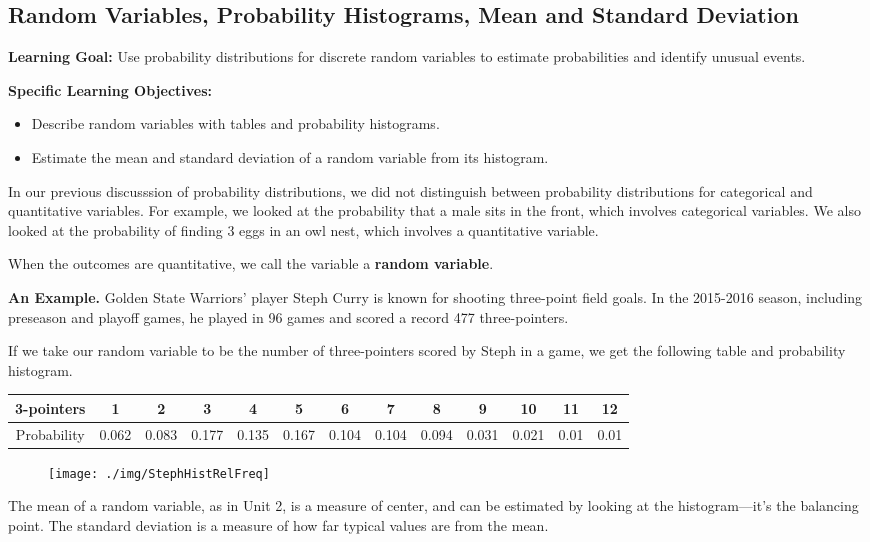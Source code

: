 \cleardoublepage
\subsection{Random Variables, Probability Histograms, Mean and Standard Deviation}
\textbf{Learning Goal:} Use probability distributions for discrete random variables to estimate probabilities and identify unusual events.

\textbf{Specific Learning Objectives:}
\begin{itemize}
\item Describe random variables with tables and probability histograms.
\item Estimate the mean and standard deviation of a random variable from its histogram.
\end{itemize}

In our previous discusssion of probability distributions, we did not distinguish between probability distributions for categorical and quantitative variables. For example, we looked at the probability that a male sits in the front, which involves categorical variables. We also looked at the probability of finding 3 eggs in an owl nest, which involves a quantitative variable.

When the outcomes are quantitative, we call the variable a \textbf{random variable}. 

\textbf{An Example.} Golden State Warriors' player Steph Curry is known for shooting three-point field goals. In the 2015-2016 season, including preseason and playoff games, he played in 96 games and scored a record 477 three-pointers. 

If we take our random variable to be the number of three-pointers scored by Steph in a game, we get the following table and probability histogram.
\begin{table}[h]\centering{}
\begin{tabular}{|c|c|c|c|c|c|c|c|c|c|c|c|c|}
\hline
3-pointers&1&2&3&4&5&6&7&8&9&10&11&12\\
\hline
Probability&0.062&0.083&0.177&0.135&0.167&0.104&0.104&0.094&0.031&0.021&0.01&0.01\\
\hline
\end{tabular}
\end{table}

\begin{figure}[h]
\centering{}\texttt{[image: ./img/StephHistRelFreq]} 
\end{figure}

The mean of a random variable, as in Unit 2, is a measure of center, and can be estimated by looking at the histogram---it's the balancing point. The standard deviation is a measure of how far typical values are from the mean. 

